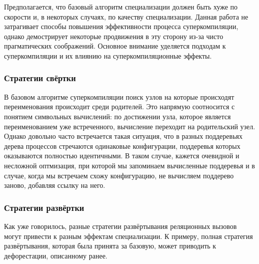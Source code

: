 Предполагается, что базовый алгоритм специализации должен быть хуже по
скорости и, в некоторых случаях, по качеству специализации.
Данная работа не затрагивает способы повышения эффективности процесса
суперкомпиляции, однако демострирует некоторые продвижения в эту сторону
из-за чисто прагматических соображений. Основное внимание уделяется
подходам к суперкомпиляции и их влиянию на суперкомпиляционные эффекты.

\subsubsection{Стратегии свёртки}

В базовом алгоритме суперкомпиляции поиск узлов на которые происходят переименования
происходит среди родителей. Это напрямую соотносится с понятием символьных
вычислений: по достижении узла, которое является переименованием уже встреченного,
вычисление переходит на родительский узел. Однако довольно часто встречается
такая ситуация,
что в разных поддеревьях дерева процессов стречаются одинаковые конфигурации,
поддеревья которых оказываются полностью идентичными. В таком случае, кажется
очевидной и несложной оптмизация, при которой мы запоминаем вычисленные
поддеревья и в случае, когда мы встречаем схожу конфигурацию, не вычисляем
поддерево заново, добавляя ссылку на него.



\subsubsection{Стратегии развёртки}

Как уже говорилось, разные стратегии развёртывания реляционных вызовов могут
привести к разным эффектам специализации. К примеру, полная стратегия развёртывания,
которая была принята за базовую, может приводить к дефорестации, описанному ранее.

